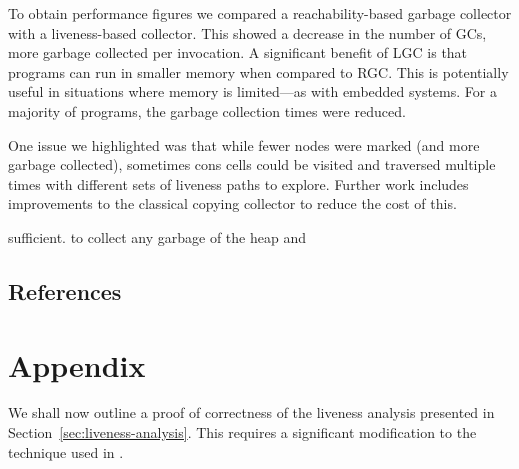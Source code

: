 \documentclass[9pt]{sigplanconf}
\newcommand{\cblue}[1]{{\color{blue}{#1}}}
\begin{document}
To obtain performance figures we compared a reachability-based garbage
collector with a liveness-based  collector.  This showed a decrease in
the  number  of  GCs,   more  garbage  collected  per  invocation.   A
significant benefit of LGC is  that programs can run in smaller memory
when compared to  RGC. This is potentially useful  in situations where
memory  is  limited---as with  embedded  systems.  For  a majority  of
programs, the garbage collection times were reduced.

One issue we  highlighted was that while fewer  nodes were marked (and
more garbage collected), sometimes  cons cells could be visited and
traversed  multiple times  with different  sets of  liveness  paths to
explore.  Further work includes  improvements to the classical copying
collector to reduce the cost of this.



sufficient.
to collect any garbage
of the heap and

\subsection{References}
{}


\pagebreak

\pagebreak
\section{Appendix}

We shall now  outline a proof of correctness  of the liveness analysis
presented  in  Section~\ref{sec:liveness-analysis}.   This requires  a
significant modification  to the technique  used in \cite{asati14lgc}.
\cblue{Good points to  make in the main text, right  in the small step
  semantics  section: Note  that the  state of  the  transition system
  consists of the current evaluation context, given by $\rho$ and $e$,
  and  the suspended evaluation  contexts recorded  in the  stack $S$.
  The heap $H$  is common to all contexts.}
\end{document}
